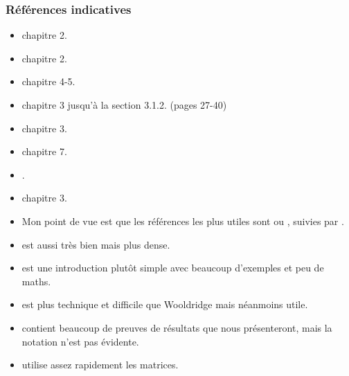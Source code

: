 \begin{frame}[allowframebreaks]
  \frametitle{Références indicatives}
  \begin{itemize}
  \item \cite{ap2014} chapitre 2.
  \item \cite{w2013} chapitre 2.    
  \item \cite{sw2009} chapitre 4-5.
 
  \item \cite{ap2009} chapitre 3 jusqu'à la section 3.1.2.
    (pages 27-40)
  \item \cite{abbring2001} chapitre 3.
  \item \cite{dbc2012} chapitre 7.
  \item \cite{bierens2010sreg}.
  \item \cite{baltagi2002} chapitre 3.
 \framebreak 
\item Mon point de vue est que les références les plus utiles sont
  \cite{w2013} ou \cite{sw2009}, suivies par \cite{ap2014}. 
\item \cite{ap2009} est aussi très bien mais plus dense. 
\item \cite{dbc2012} est une introduction plutôt simple avec beaucoup
  d'exemples et peu de maths.
\item \cite{baltagi2002}  est plus technique et difficile que
  Wooldridge mais néanmoins utile.
\item  \cite{bierens2010sreg}
contient beaucoup de preuves de résultats que nous présenteront, mais
la notation n'est pas évidente.
\item \cite{abbring2001} utilise assez rapidement les matrices.
\end{itemize}
\end{frame}

